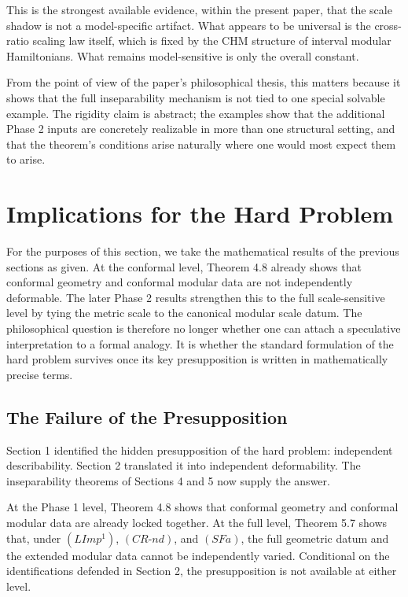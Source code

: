 \documentclass[12pt]{article}
\theoremstyle{definition}
\theoremstyle{remark}
\begin{document}
This is the strongest available evidence, within the present paper, that
the scale shadow is not a model-specific artifact. What appears to be
universal is the cross-ratio scaling law itself, which is fixed by the
CHM structure of interval modular Hamiltonians. What remains
model-sensitive is only the overall constant.

From the point of view of the paper's philosophical thesis, this matters
because it shows that the full inseparability mechanism is not tied to
one special solvable example. The rigidity claim is abstract; the
examples show that the additional Phase 2 inputs are concretely
realizable in more than one structural setting, and that the theorem's
conditions arise naturally where one would most expect them to arise.

\section{Implications for the Hard
Problem}\label{implications-for-the-hard-problem}

For the purposes of this section, we take the mathematical results of
the previous sections as given. At the conformal level, Theorem 4.8
already shows that conformal geometry and conformal modular data are not
independently deformable. The later Phase 2 results strengthen this to
the full scale-sensitive level by tying the metric scale to the
canonical modular scale datum. The philosophical question is therefore no longer
whether one can attach a speculative interpretation to a formal analogy.
It is whether the standard formulation of the hard problem survives once
its key presupposition is written in mathematically precise terms.

\subsection{The Failure of the
Presupposition}\label{the-failure-of-the-presupposition}

Section 1 identified the hidden presupposition of the hard problem:
independent describability. Section 2 translated it into independent
deformability. The inseparability theorems of Sections 4 and 5 now
supply the answer.

At the Phase 1 level, Theorem 4.8 shows that conformal geometry and
conformal modular data are already locked together. At the full level,
Theorem 5.7 shows that, under \((LImp^1)\), \((CR\text{-}nd)\), and
\((SFa)\), the full geometric datum and the extended modular
data cannot be independently varied. Conditional on the identifications
defended in Section 2, the presupposition is not available at either
level.
\end{document}

